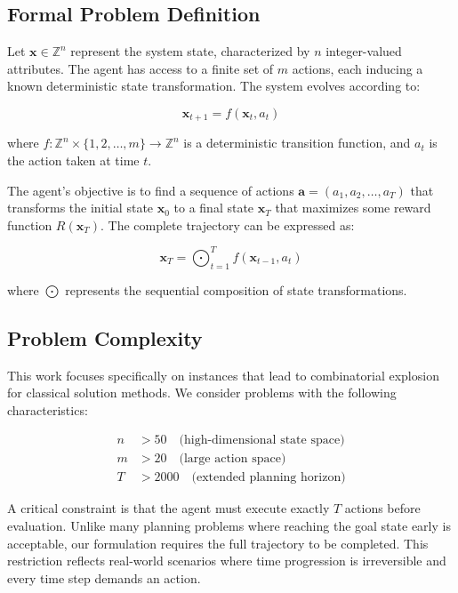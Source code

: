 \documentclass[11pt, a4paper]{article}
\begin{document}
\subsection{Formal Problem Definition}

Let $\mathbf{x} \in \mathbb{Z}^n$ represent the system state, characterized by $n$ integer-valued attributes. The agent has access to a finite set of $m$ actions, each inducing a known deterministic state transformation. The system evolves according to:

\begin{equation}
\mathbf{x}_{t+1} = f(\mathbf{x}_t, a_t)
\end{equation}

where $f: \mathbb{Z}^n \times \{1, 2, \ldots, m\} \rightarrow \mathbb{Z}^n$ is a deterministic transition function, and $a_t$ is the action taken at time $t$.

The agent's objective is to find a sequence of actions $\mathbf{a} = (a_1, a_2, \ldots, a_T)$ that transforms the initial state $\mathbf{x}_0$ to a final state $\mathbf{x}_T$ that maximizes some reward function $R(\mathbf{x}_T)$. The complete trajectory can be expressed as:

\begin{equation}
\mathbf{x}_T = \bigodot_{t=1}^{T} f(\mathbf{x}_{t-1}, a_t)
\end{equation}

where $\bigodot$ represents the sequential composition of state transformations.

\subsection{Problem Complexity}

This work focuses specifically on instances that lead to combinatorial explosion for classical solution methods. We consider problems with the following characteristics:

\begin{align}
n &> 50 \quad \text{(high-dimensional state space)} \\
m &> 20 \quad \text{(large action space)} \\
T &> 2000 \quad \text{(extended planning horizon)}
\end{align}

A critical constraint is that the agent must execute exactly $T$ actions before evaluation. Unlike many planning problems where reaching the goal state early is acceptable, our formulation requires the full trajectory to be completed. This restriction reflects real-world scenarios where time progression is irreversible and every time step demands an action.
\end{document}

